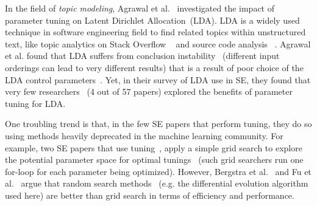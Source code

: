 \documentclass[sigconf]{acmart}
\theoremstyle{break}
\newcommand{\bi}{\begin{itemize}[leftmargin=0.4cm]}
\newcommand{\ei}{\end{itemize}}
\begin{document}
In the field of {\em topic modeling}, Agrawal et al.~\cite{agrawal2016wrong} investigated 
the impact of parameter tuning on Latent Dirichlet Allocation~(LDA).
LDA 
  is a widely used technique in software engineering field
to find related topics within unstructured text, 
like topic analytics on Stack Overflow ~\cite{barua2014developers}
and source code analysis ~\cite{binkley2014understanding}.
 Agrawal et al. found that LDA suffers from conclusion instability
~(different input orderings can lead to very different results)
that is a result of poor choice of the LDA control parameters~\cite{agrawal2016wrong}. 
Yet, in their survey of LDA use in SE, they found that very few  
researchers ~(4 out of 57 papers) explored the benefits of parameter tuning for LDA.

One troubling trend is that, in the few SE papers that perform tuning,
they do so using methods heavily deprecated in the machine learning community.
For example, two SE papers that use tuning~\cite{lessmann2008benchmarking,tantithamthavorn2016automated}, 
apply a simple grid search to explore the potential parameter space for optimal tunings
~(such grid searchers run one for-loop for each parameter being optimized). 
However, Bergstra et al.~\cite{bergstra2012random} and 
Fu et al.~\cite{fu2016differential} argue that random search methods
~(e.g. the 
differential evolution algorithm used here) are better than 
grid search in terms of efficiency and performance.

\end{document}
